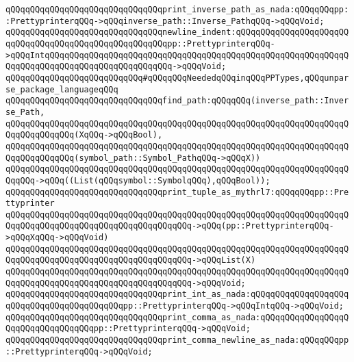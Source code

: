 \verb|qQQqqQQqqQQqqQQqqQQqqQQqqQQqqQQqprint_inverse_path_as_nada:qQQqqQQqpp::PrettyprinterqQQq->qQQqinverse_path::Inverse_PathqQQq->qQQqVoid;|\newline
\verb|qQQqqQQqqQQqqQQqqQQqqQQqqQQqqQQqnewline_indent:qQQqqQQqqQQqqQQqqQQqqQQqqQQqqQQqqQQqqQQqqQQqqQQqqQQqqQQqpp::PrettyprinterqQQq->qQQqIntqQQqqQQqqQQqqQQqqQQqqQQqqQQqqQQqqQQqqQQqqQQqqQQqqQQqqQQqqQQqqQQqqQQqqQQqqQQqqQQqqQQqqQQqqQQqqQQq->qQQqVoid;|\newline
\newline
\verb|qQQqqQQqqQQqqQQqqQQqqQQqqQQq#qQQqqQQqNeededqQQqinqQQqPPTypes,qQQqunparse_package_languageqQQq|\newline
\newline
\verb|qQQqqQQqqQQqqQQqqQQqqQQqqQQqqQQqfind_path:qQQqqQQq(inverse_path::Inverse_Path,|\newline
\verb|qQQqqQQqqQQqqQQqqQQqqQQqqQQqqQQqqQQqqQQqqQQqqQQqqQQqqQQqqQQqqQQqqQQqqQQqqQQqqQQqqQQq(XqQQq->qQQqBool),|\newline
\verb|qQQqqQQqqQQqqQQqqQQqqQQqqQQqqQQqqQQqqQQqqQQqqQQqqQQqqQQqqQQqqQQqqQQqqQQqqQQqqQQqqQQq(symbol_path::Symbol_PathqQQq->qQQqX))|\newline
\verb|qQQqqQQqqQQqqQQqqQQqqQQqqQQqqQQqqQQqqQQqqQQqqQQqqQQqqQQqqQQqqQQqqQQqqQQqqQQq->qQQq((List(qQQqsymbol::SymbolqQQq),qQQqBool));|\newline
\newline
\verb|qQQqqQQqqQQqqQQqqQQqqQQqqQQqqQQqprint_tuple_as_mythrl7:qQQqqQQqpp::Prettyprinter|\newline
\verb|qQQqqQQqqQQqqQQqqQQqqQQqqQQqqQQqqQQqqQQqqQQqqQQqqQQqqQQqqQQqqQQqqQQqqQQqqQQqqQQqqQQqqQQqqQQqqQQqqQQqqQQqqQQq->qQQq(pp::PrettyprinterqQQq->qQQqXqQQq->qQQqVoid)|\newline
\verb|qQQqqQQqqQQqqQQqqQQqqQQqqQQqqQQqqQQqqQQqqQQqqQQqqQQqqQQqqQQqqQQqqQQqqQQqqQQqqQQqqQQqqQQqqQQqqQQqqQQqqQQqqQQq->qQQqList(X)|\newline
\verb|qQQqqQQqqQQqqQQqqQQqqQQqqQQqqQQqqQQqqQQqqQQqqQQqqQQqqQQqqQQqqQQqqQQqqQQqqQQqqQQqqQQqqQQqqQQqqQQqqQQqqQQqqQQq->qQQqVoid;|\newline
\newline
\verb|qQQqqQQqqQQqqQQqqQQqqQQqqQQqqQQqprint_int_as_nada:qQQqqQQqqQQqqQQqqQQqqQQqqQQqqQQqqQQqqQQqqQQqpp::PrettyprinterqQQq->qQQqIntqQQq->qQQqVoid;|\newline
\verb|qQQqqQQqqQQqqQQqqQQqqQQqqQQqqQQqprint_comma_as_nada:qQQqqQQqqQQqqQQqqQQqqQQqqQQqqQQqqQQqpp::PrettyprinterqQQq->qQQqVoid;|\newline
\verb|qQQqqQQqqQQqqQQqqQQqqQQqqQQqqQQqprint_comma_newline_as_nada:qQQqqQQqpp::PrettyprinterqQQq->qQQqVoid;|\newline

